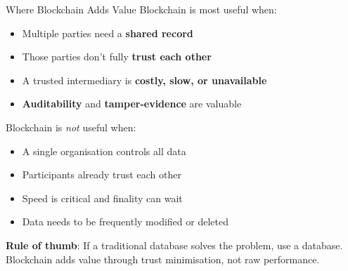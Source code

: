 \documentclass[10pt]{beamer}
\newcommand{\highlight}[1]{\textcolor{AccentOrange}{\textbf{#1}}}
\begin{document}
\begin{frame}{Where Blockchain Adds Value}
  Blockchain is most useful when:
  
  \vspace{0.5em}
  \begin{itemize}
    \item Multiple parties need a \highlight{shared record}
    \item Those parties don't fully \highlight{trust each other}
    \item A trusted intermediary is \highlight{costly, slow, or unavailable}
    \item \highlight{Auditability} and \highlight{tamper-evidence} are valuable
  \end{itemize}
  
  \vspace{1em}
  Blockchain is \textit{not} useful when:
  
  \vspace{0.5em}
  \begin{itemize}
    \item A single organisation controls all data
    \item Participants already trust each other
    \item Speed is critical and finality can wait
    \item Data needs to be frequently modified or deleted
  \end{itemize}
  
  \vspace{1em}
  \textbf{Rule of thumb}: If a traditional database solves the problem, use a database. Blockchain adds value through trust minimisation, not raw performance.
\end{frame}
\end{document}
